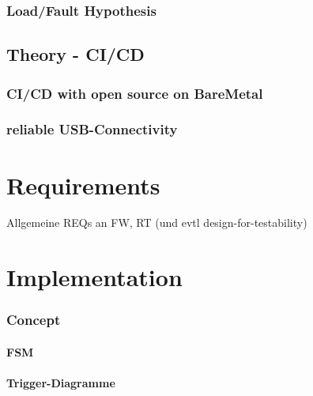 	\subsection{Load/Fault Hypothesis}

	\section{Theory - CI/CD}
	\subsection{CI/CD with open source on BareMetal}
	\subsection{reliable USB-Connectivity}
	
\chapter{Requirements}
\label{cha:Requirements}
	Allgemeine REQs an FW, RT (und evtl design-for-testability)

\chapter{Implementation}
\label{cha:Implementation}
	\subsection{Concept}
	\subsubsection{FSM}
	\subsubsection{Trigger-Diagramme}

